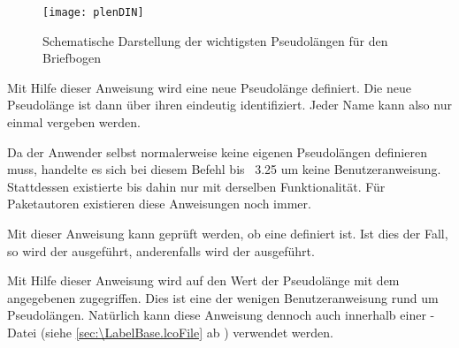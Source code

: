 \begin{figure}
  \centering
  \texttt{[image: plenDIN]}
  \caption{Schematische Darstellung der wichtigsten Pseudolängen für den
    Briefbogen}
  \label{fig:scrlttr2-experts.pseudoLengths}
\end{figure}


\begin{Declaration}
\end{Declaration}
Mit Hilfe dieser
Anweisung wird eine neue Pseudolänge definiert. Die neue Pseudolänge ist dann
über ihren  eindeutig identifiziert. Jeder Name kann also nur
einmal vergeben werden.
%
\iffalse %
Es wird sichergestellt, dass jeder \PName{Name} nur
einmal vergeben wird.%
\else
\iffalse
Wird versucht, eine bereits vorhandene Pseudolänge erneut
zu definieren, so wird dies mit einer Fehlermeldung quittiert.%
\fi
%
\fi

%
Da der Anwender selbst normalerweise keine eigenen Pseudolängen definieren
muss, handelte es sich bei diesem Befehl bis \KOMAScript~3.25 um keine
Benutzeranweisung. Stattdessen existierte bis dahin nur 
mit derselben Funktionalität. Für Paketautoren existieren diese Anweisungen
noch immer.%
\EndIndexGroup


\begin{Declaration}
\end{Declaration}
Mit dieser Anweisung
kann geprüft werden, ob eine  definiert ist. Ist dies der
Fall, so wird der  ausgeführt, anderenfalls wird der
 ausgeführt.%
%
\EndIndexGroup


\begin{Declaration}
\end{Declaration}
Mit Hilfe dieser Anweisung wird auf den Wert der Pseudolänge mit dem
angegebenen  zugegriffen. Dies ist eine der wenigen
Benutzeranweisung rund um Pseudolängen. Natürlich kann diese Anweisung dennoch
auch innerhalb einer -Datei (siehe
\autoref{sec:\LabelBase.lcoFile} ab )
verwendet werden.%
%
\EndIndexGroup



